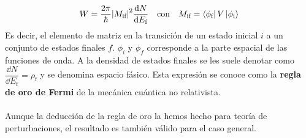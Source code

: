 \begin{equation}
    W=\frac{2\pi}{\hbar} \abs{M_\text{if}}^2 \dv{N}{E_\text{f}} \quad \text{con} \quad M_\text{if}=\bra{\phi_\text{f}}V\ket{\phi_\text{i}}
    \label{eq: regla de oro de fermi}
\end{equation}
Es decir, el elemento de matriz en la transición de un estado inicial $i$ a un conjunto de estados finales $f$. $\phi_i$ y $\phi_f$  corresponde a la parte espacial de las funciones de onda. A la densidad de estados finales se les suele denotar como $\dfrac{\dd N}{\dd E_\text{f}}=\rho_\text{f}$ y se denomina espacio fásico. Esta expresión se conoce como la \textbf{regla de oro de Fermi} de la mecánica cuántica no relativista.\\\\
Aunque la deducción de la regla de oro la hemos hecho para teoría de perturbaciones, el resultado es también válido para el caso general.

